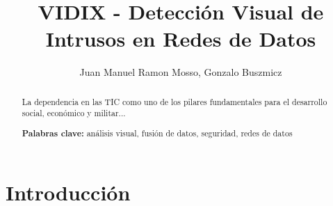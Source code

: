 \documentclass[a4paper]{./plantillas/llncs}
\begin{document}
\mainmatter  %

\title{VIDIX - Detección Visual de Intrusos en Redes de Datos}


%
%
\author{Juan Manuel Ramon Mosso, Gonzalo Buszmicz}
%


%
%

\maketitle


\begin{abstract}
La dependencia en las TIC como uno de los pilares fundamentales para el desarrollo social, económico y militar... \newline 

{\bfseries Palabras clave:} análisis visual, fusión de datos, seguridad, redes de datos 

\end{abstract}



\section{Introducción}
\end{document}
